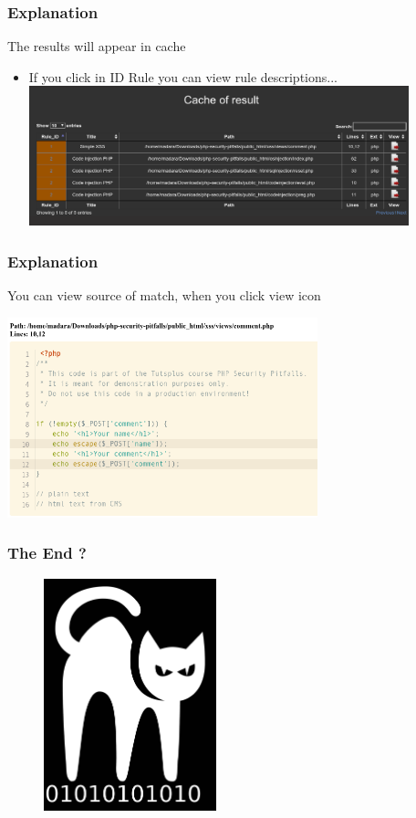 \documentclass[serif,mathserif]{beamer}
\begin{document}
\begin{frame}
  \frametitle{Explanation}
  The results will appear in cache
  \begin{itemize}
  \item If you click in ID Rule you can view rule descriptions...		  
  \includegraphics[width=11cm]{images/cache.png} 
  \end{itemize}
\end{frame}


\begin{frame}
  \frametitle{Explanation}
  You can view source of match, when you click view icon
  \begin{itemize}	
  \includegraphics[width=9cm]{images/codeview.png} 
  \end{itemize}
\end{frame}


\begin{frame}
  \frametitle{The End ?}
  \begin{figure}[]    
    \centering
    \includegraphics[width=5cm]{images/codecat01.png} 
  \end{figure}
\end{frame}
\end{document}
